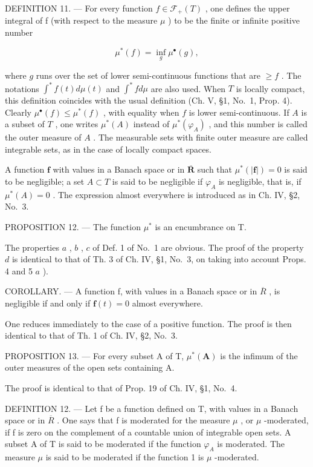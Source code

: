 DEFINITION 11. --- For every function \(f \in \mathcal{F}_{+}(T)\) , one defines the upper integral of f (with respect to the measure \(\mu\) ) to be the finite or infinite positive number

\[
\mu^ {*} (f) = \inf _ {g} \mu^ {\bullet} (g),\tag{9}
\]

where \(g\) runs over the set of lower semi-continuous functions that are \(\geqslant f\) . The notations \(\int^{*} f(t) d\mu(t)\) and \(\int^{*} f d\mu\) are also used. When \(T\) is locally compact, this definition coincides with the usual definition (Ch. V, §1, No.~1, Prop. 4). Clearly \(\mu^{\bullet}(f) \leqslant \mu^{*}(f)\) , with equality when \(f\) is lower semi-continuous. If \(A\) is a subset of \(T\) , one writes \(\mu^{*}(A)\) instead of \(\mu^{*}(\varphi_{A})\) , and this number is called the outer measure of \(A\) . The measurable sets with finite outer measure are called integrable sets, as in the case of locally compact spaces.

A function \(\mathbf{f}\) with values in a Banach space or in \(\overline{\mathbf{R}}\) such that \(\mu^{*}(|\mathbf{f}|)=0\) is said to be negligible; a set \(A\subset T\) is said to be negligible if \(\varphi_{A}\) is negligible, that is, if \(\mu^{*}(A)=0\) . The expression almost everywhere is introduced as in Ch. IV, §2, No.~3.

PROPOSITION 12. --- The function \(\mu^{*}\) is an encumbrance on T.

The properties \(a\) , \(b\) , \(c\) of Def. 1 of No.~1 are obvious. The proof of the property \(d\) is identical to that of Th. 3 of Ch. IV, §1, No.~3, on taking into account Props. 4 and 5 \(a\) ).

COROLLARY. --- A function f, with values in a Banach space or in \(\overline{R}\) , is negligible if and only if \(\mathbf{f}(t)=0\) almost everywhere.

One reduces immediately to the case of a positive function. The proof is then identical to that of Th. 1 of Ch. IV, §2, No.~3.

PROPOSITION 13. --- For every subset A of T, \(\mu^{*}(\mathbf{A})\) is the infimum of the outer measures of the open sets containing A.

The proof is identical to that of Prop. 19 of Ch. IV, §1, No.~4.

DEFINITION 12. --- Let f be a function defined on T, with values in a Banach space or in \(\overline{R}\) . One says that f is moderated for the measure \(\mu\) , or \(\mu\) -moderated, if f is zero on the complement of a countable union of integrable open sets. A subset A of T is said to be moderated if the function \(\varphi_{A}\) is moderated. The measure \(\mu\) is said to be moderated if the function 1 is \(\mu\) -moderated.

